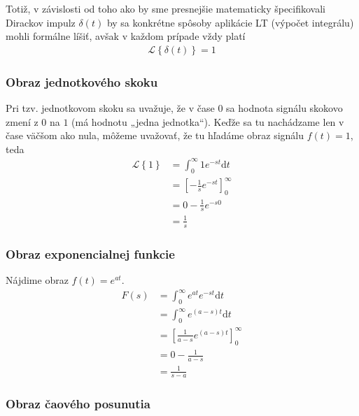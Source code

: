\documentclass[a4paper, 10pt, ]{article}
\begin{document}
Totiž, v závislosti od toho ako by sme presnejšie matematicky špecifikovali Dirackov impulz $\delta(t)$ by sa konkrétne spôsoby aplikácie LT (výpočet integrálu) mohli formálne líšiť, avšak v každom prípade vždy platí
\begin{align}
    \mathcal L \left\{ \delta(t) \right\} = 1
\end{align}


\subsubsection{Obraz jednotkového skoku}
Pri tzv. jednotkovom skoku sa uvažuje, že v čase $0$ sa hodnota signálu skokovo zmení z $0$ na $1$ (má hodnotu „jedna jednotka“). Keďže sa tu nachádzame len v čase väčšom ako nula, môžeme uvažovať, že tu hľadáme obraz signálu $f(t) = 1$, teda
\begin{equation}
    \begin{aligned}
        \mathcal L \left\{ 1 \right\} &= \int_0^\infty 1 e^{-st}\text{d}t \\
        &= \left[ - \frac{1}{s} e^{-st} \right]_0^\infty \\
        &= 0 - \frac{1}{s} e^{-s0} \\
        &= \frac{1}{s}
    \end{aligned}
\end{equation}




\subsubsection{Obraz exponencialnej funkcie}
\label{vyhlcast}

Nájdime obraz $f(t) = e^{at}$.
\begin{equation}
    \begin{aligned}
        F(s) &= \int_0^\infty e^{at} e^{-st}\text{d}t \\
        &= \int_0^\infty e^{(a-s)t}\text{d}t \\
        &= \left[ \frac{1}{a-s} e^{(a-s)t} \right]_0^\infty \\
        &= 0 - \frac{1}{a-s} \\
        &= \frac{1}{s - a}
    \end{aligned}
\end{equation}



\subsubsection{Obraz čaového posunutia}
\end{document}
